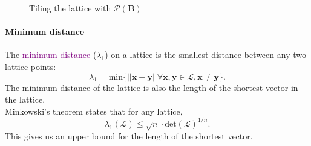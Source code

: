 \documentclass[a4paper, 11pt, openany]{book}
\numberwithin{equation}{section}
\theoremstyle{plain}
\theoremstyle{definition}
\newcommand{\Define}[1]{\textcolor{purple}{#1}}
\begin{document}
\begin{figure}[ht]
\begin{minipage}{.5\textwidth}
{{}}
	\caption{Tiling the lattice with $\mathcal{P}(\textbf{B})$}
	\label{fg:tile}
\end{minipage}
\end{figure}

\paragraph{Minimum distance} The \Define{minimum distance} ($\lambda_1$) on a lattice is the smallest distance between any two lattice points: $$\lambda_1 = \text{min}\{||\textbf{x} - \textbf{y}|| \forall \textbf{x},\textbf{y}\in\mathcal{L}, \textbf{x}\neq\textbf{y}\}.$$
The minimum distance of the lattice is also the length of the shortest vector in the lattice.
\\
Minkowski's theorem states that for any lattice, 
\[
    \lambda_1(\mathcal{L}) \leq \sqrt{n}\cdot\text{det}(\mathcal{L})^{1/n}. 
\]
This gives us an upper bound for the length of the shortest vector.
\end{document}
